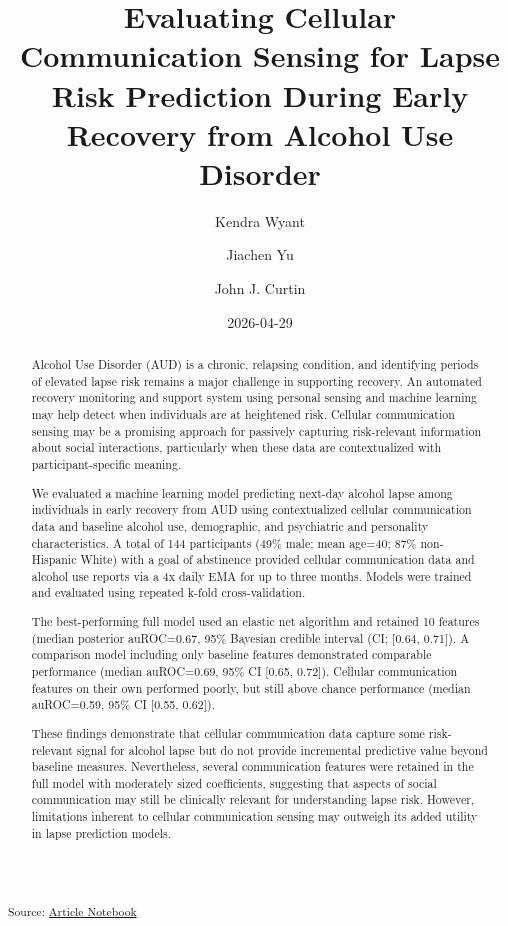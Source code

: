 \documentclass[
  letterpaper,
  DIV=11,
  numbers=noendperiod]{scrartcl}
\title{Evaluating Cellular Communication Sensing for Lapse Risk
Prediction During Early Recovery from Alcohol Use Disorder}
\author{Kendra Wyant \and Jiachen Yu \and John J. Curtin}
\date{2026-04-29}
\begin{document}
\maketitle
\begin{abstract}
Alcohol Use Disorder (AUD) is a chronic, relapsing condition, and
identifying periods of elevated lapse risk remains a major challenge in
supporting recovery. An automated recovery monitoring and support system
using personal sensing and machine learning may help detect when
individuals are at heightened risk. Cellular communication sensing may
be a promising approach for passively capturing risk-relevant
information about social interactions, particularly when these data are
contextualized with participant-specific meaning.

We evaluated a machine learning model predicting next-day alcohol lapse
among individuals in early recovery from AUD using contextualized
cellular communication data and baseline alcohol use, demographic, and
psychiatric and personality characteristics. A total of 144 participants
(49\% male; mean age=40; 87\% non-Hispanic White) with a goal of
abstinence provided cellular communication data and alcohol use reports
via a 4x daily EMA for up to three months. Models were trained and
evaluated using repeated k-fold cross-validation.

The best-performing full model used an elastic net algorithm and
retained 10 features (median posterior auROC=0.67, 95\% Bayesian
credible interval (CI; {[}0.64, 0.71{]}). A comparison model including
only baseline features demonstrated comparable performance (median
auROC=0.69, 95\% CI {[}0.65, 0.72{]}). Cellular communication features
on their own performed poorly, but still above chance performance
(median auROC=0.59, 95\% CI {[}0.55, 0.62{]}).

These findings demonstrate that cellular communication data capture some
risk-relevant signal for alcohol lapse but do not provide incremental
predictive value beyond baseline measures. Nevertheless, several
communication features were retained in the full model with moderately
sized coefficients, suggesting that aspects of social communication may
still be clinically relevant for understanding lapse risk. However,
limitations inherent to cellular communication sensing may outweigh its
added utility in lapse prediction models.
\end{abstract}


\textsubscript{Source:
\href{https://jjcurtin.github.io/study_messages/index.qmd.html}{Article
Notebook}}
\end{document}
